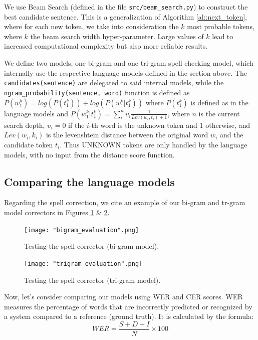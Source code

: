 \documentclass[11pt, a4paper]{article}
\begin{document}
	We use Beam Search (defined in the file \texttt{src/beam\_search.py}) to construct the best candidate sentence. This is a generalization of Algorithm \ref{al::next_token}, where for each new token, we take into consideration the $k$ most probable tokens, where $k$ the beam search width hyper-parameter. Large values of $k$ lead to increased computational complexity but also more reliable results.
	
	We define two models, one bi-gram and one tri-gram spell checking model, which internally use the respective language models defined in the section above. The \texttt{candidates(sentence)} are delegated to said internal models, while the \texttt{ngram\_probability(sentence, word)} function is defined as $P(w^{k}_1) =log(P(t^k_1)) + log(P(w^{k}_1 | t^k_1))$ where $P(t^k_1)$ is defined as in the language models and $ P(w^{k}_1 | t^k_1) = \sum^n_i \upsilon_i \frac{1}{Lev(w_i, t_i) + 1}$, where $n$ is the current search depth, $\upsilon_i = 0$ if the $i$-th word is the unknown token and 1 otherwise, and $Lev(w_i, k_i)$ is the levenshtein distance between the original word $w_i$ and the candidate token $t_i$. Thus UNKNOWN tokens are only handled by the language models, with no input from the distance score function.

	
	\subsection{Comparing the language models}
	
	Regarding the spell correction, we cite an example of our bi-gram and tr-gram model correctors in Figures \ref{fig::spell_check_example_bigram} \& \ref{fig::spell_check_example_trigram}.
	
	 \begin{figure}
	    \centering
	    \texttt{[image: "bigram\_evaluation".png]}
	    \label{fig::spell_check_example_bigram}
	    \caption{Testing the spell corrector (bi-gram model).}
	\end{figure}

	\begin{figure}
	    \centering
	    \texttt{[image: "trigram\_evaluation".png]}
	    \label{fig::spell_check_example_trigram}
	    \caption{Testing the spell corrector (tri-gram model).}
	\end{figure}


     Now, let's consider comparing our models using WER and CER scores. WER measures the percentage of words that are incorrectly predicted or recognized by a system compared to a reference (ground truth). It is calculated by the formula: 
      \[  WER = \frac{S + D + I}{N} \times 100 \]
\end{document}
